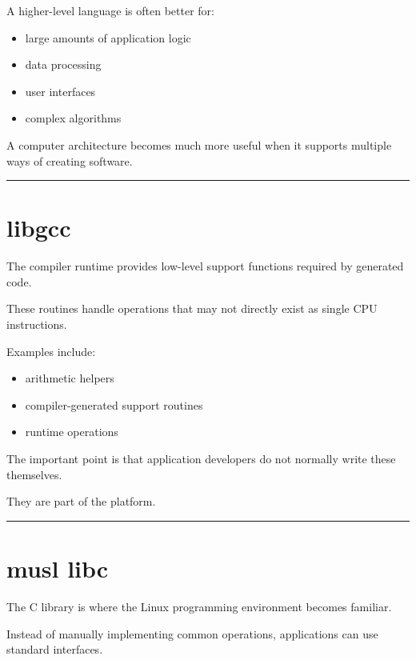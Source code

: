 \documentclass[
  oneside,
  openany]{book}
\providecommand{\tightlist}{%
  \setlength{\itemsep}{0pt}\setlength{\parskip}{0pt}}
\begin{document}
A higher-level language is often better for:

\begin{itemize}
\tightlist
\item
  large amounts of application logic
\item
  data processing
\item
  user interfaces
\item
  complex algorithms
\end{itemize}

A computer architecture becomes much more useful when it supports
multiple ways of creating software.

\begin{center}\rule{0.5\linewidth}{0.5pt}\end{center}

\hypertarget{libgcc}{%
\section{libgcc}\label{libgcc}}

The compiler runtime provides low-level support functions required by
generated code.

These routines handle operations that may not directly exist as single
CPU instructions.

Examples include:

\begin{itemize}
\tightlist
\item
  arithmetic helpers
\item
  compiler-generated support routines
\item
  runtime operations
\end{itemize}

The important point is that application developers do not normally write
these themselves.

They are part of the platform.

\begin{center}\rule{0.5\linewidth}{0.5pt}\end{center}

\hypertarget{musl-libc}{%
\section{musl libc}\label{musl-libc}}

The C library is where the Linux programming environment becomes
familiar.

Instead of manually implementing common operations, applications can use
standard interfaces.
\end{document}
